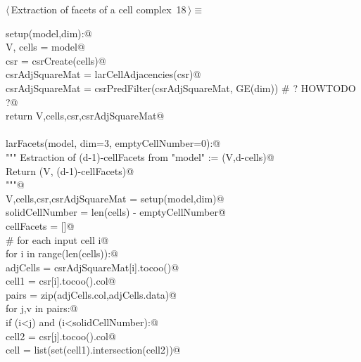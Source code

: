 \documentclass[11pt,oneside]{article}    %
\begin{document}
\begin{flushleft} \small \label{scrap28}
\protect{}$\langle\,$Extraction of facets of a cell complex\nobreak\ {\footnotesize 18}$\,\rangle\equiv$
\vspace{-1ex}
\begin{list}{}{} \item
\mbox{}\verb@def setup(model,dim):@\\
\mbox{}\verb@    V, cells = model@\\
\mbox{}\verb@    csr = csrCreate(cells)@\\
\mbox{}\verb@    csrAdjSquareMat = larCellAdjacencies(csr)@\\
\mbox{}\verb@    csrAdjSquareMat = csrPredFilter(csrAdjSquareMat, GE(dim)) # ? HOWTODO ?@\\
\mbox{}\verb@    return V,cells,csr,csrAdjSquareMat@\\
\mbox{}\verb@@\\
\mbox{}\verb@def larFacets(model, dim=3, emptyCellNumber=0):@\\
\mbox{}\verb@    """ Estraction of (d-1)-cellFacets from "model" := (V,d-cells)@\\
\mbox{}\verb@        Return (V, (d-1)-cellFacets)@\\
\mbox{}\verb@        """@\\
\mbox{}\verb@    V,cells,csr,csrAdjSquareMat = setup(model,dim)@\\
\mbox{}\verb@    solidCellNumber = len(cells) - emptyCellNumber@\\
\mbox{}\verb@    cellFacets = []@\\
\mbox{}\verb@    # for each input cell i@\\
\mbox{}\verb@    for i in range(len(cells)):@\\
\mbox{}\verb@        adjCells = csrAdjSquareMat[i].tocoo()@\\
\mbox{}\verb@        cell1 = csr[i].tocoo().col@\\
\mbox{}\verb@        pairs = zip(adjCells.col,adjCells.data)@\\
\mbox{}\verb@        for j,v in pairs:@\\
\mbox{}\verb@            if (i<j) and (i<solidCellNumber):@\\
\mbox{}\verb@                cell2 = csr[j].tocoo().col@\\
\mbox{}\verb@                cell = list(set(cell1).intersection(cell2))@\\

\end{list}
\end{flushleft}
\end{document}
